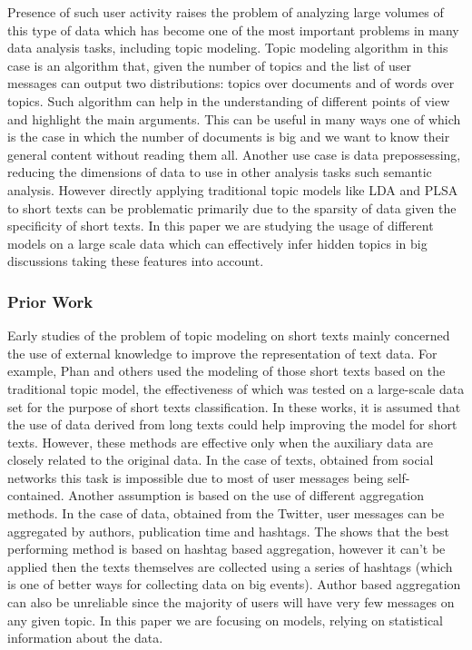 Presence of such user activity raises the problem of analyzing large volumes of this type of data which has become one of the most important problems in many data analysis tasks, including topic modeling. Topic modeling algorithm in this case is an algorithm that, given the number of topics and the list of user messages can output two distributions: topics over documents and of words over topics. Such algorithm can help in the understanding of different points of view and highlight the main arguments. This can be useful in many ways one of which is the case in which the number of documents is big and we want to know their general content without reading them all. Another use case is data prepossessing, reducing the dimensions of data to use in other analysis tasks such semantic analysis. However directly applying traditional topic models like LDA and PLSA to short texts can be problematic primarily due to the sparsity of data given the specificity of short texts. In this paper we are studying the usage of different models on a large scale data which can effectively infer hidden topics in big discussions taking these features into account.

\subsubsection{Prior Work}

Early studies of the problem of topic modeling on short texts mainly concerned the use of external knowledge to improve the representation of text data. For example, Phan and others \cite{HoriguchiPhanNguyen} used the modeling of those short texts based on the traditional topic model, the effectiveness of which was tested on a large-scale data set for the purpose of short texts classification. In these works, it is assumed that the use of data derived from long texts could help improving the model for short texts. However, these methods are effective only when the auxiliary data are closely related to the original data. In the case of texts, obtained from social networks this task is impossible due to most of user messages being self-contained. Another assumption is based on the use of different aggregation methods. In the case of data, obtained from the Twitter, user messages can be aggregated by authors, publication time and hashtags. The \cite{WrayLexingRishabh} shows that the best performing method is based on hashtag based aggregation, however it can’t be applied then the texts themselves are collected using a series of hashtags (which is one of better ways for collecting data on big events). Author based aggregation can also be unreliable since the majority of users will have very few messages on any given topic. In this paper we are focusing on models, relying on statistical information about the data.


